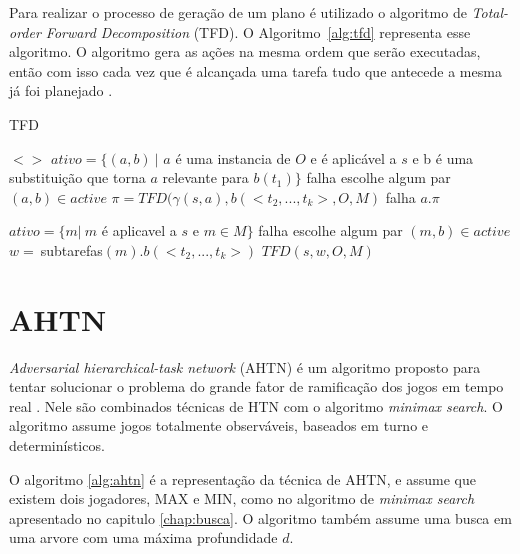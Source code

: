 Para realizar o processo de geração de um plano é utilizado o algoritmo de \textit{Total-order Forward Decomposition} (TFD). O Algoritmo~\ref{alg:tfd} representa esse algoritmo. O algoritmo gera as ações na mesma ordem que serão executadas, então com isso cada vez que é alcançada uma tarefa tudo que antecede a mesma já foi planejado \cite{ghallab2004automated}.
 
\begin{algorithm}
	\caption{TFD}
	\label{alg:tfd}
	\begin{algorithmic}[1]		
				\State	\Return $<>$
			\EndIf
				\State $ativo = \{(a, b)~ |$ $a$ é uma instancia de $O$ e é aplicável a $s$ e b é uma substituição que torna $a$ relevante para $b(t_{1})\}$
					\State \Return falha
				\EndIf
				\State escolhe algum par $(a, b) \in active$
				\State $\pi = TFD(\gamma(s, a), b(<t_{2}, ..., t_{k}>, O, M)$
					\State \Return falha
				\Else 
					\State \Return $a . \pi$
			\EndIf
			
				\State $ativo = \{m |~ m$ é aplicavel a $s$ e $m \in M\}$
					\State \Return falha
				\EndIf
				\State escolhe algum par $(m, b) \in active$
				\State $w =~ $subtarefas$(m).b(<t_{2}, ..., t_{k}>)$
				\State \Return $TFD(s, w, O, M)$
				\EndIf
		\EndFunction
	\end{algorithmic}
\end{algorithm}

\section{AHTN} 

\textit{Adversarial hierarchical-task network} (AHTN) é um algoritmo proposto para tentar solucionar o problema do grande fator de ramificação dos jogos em tempo real \cite{ontanon2015adversarial}. Nele são combinados técnicas de HTN com o algoritmo \textit{minimax search}. O algoritmo assume jogos totalmente observáveis, baseados em turno e determinísticos.

O algoritmo \ref{alg:ahtn} \cite{ontanon2015adversarial} é a representação da técnica de AHTN, e assume que existem dois jogadores, MAX e MIN, como no algoritmo de \textit{minimax search} apresentado no capitulo \ref{chap:busca}. O algoritmo também assume uma busca em uma arvore com uma máxima profundidade $d$.

